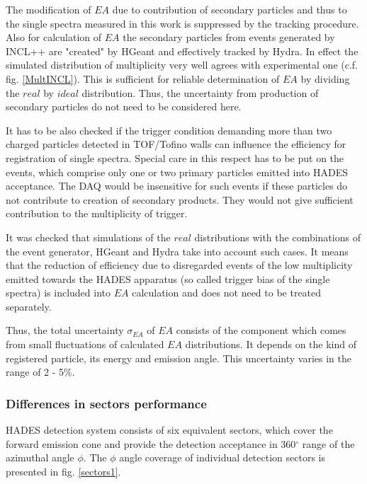 The modification of $EA$ due to contribution of secondary particles and thus to the single spectra measured in this work is suppressed by the
tracking procedure. Also for calculation of $EA$ the 
secondary particles from events generated by INCL++ 
are "created" by HGeant and effectively tracked by Hydra. In effect the simulated distribution of multiplicity very well agrees with experimental one (c.f. fig. \ref{MultINCL}). This is sufficient for 
reliable determination of $EA$ by dividing the $real$ by $ideal$ distribution. Thus, the uncertainty 
from production of secondary particles  do not need to be considered here.

It has to be also checked if the trigger condition
demanding more than two charged particles detected 
in TOF/Tofino walls can influence the efficiency for registration of single spectra. 
Special care in this respect has to be put on the events, which comprise only one or two 
primary particles emitted into HADES acceptance.
The DAQ would be insensitive for such events if  
these particles do not contribute to creation of 
secondary products. They would not give sufficient contribution to the multiplicity of trigger.

It was checked that simulations of the $real$ distributions with the combinations of the event generator, HGeant and Hydra take into account 
such cases. It means that the reduction 
of efficiency due to disregarded events of 
the low multiplicity emitted towards 
the HADES apparatus (so called trigger bias of the 
single spectra) is included into $EA$ calculation 
and does not need to be treated separately.  

Thus, the total uncertainty $\sigma_{EA}$ of $EA$ consists of the component which comes from small fluctuations of calculated $EA$ distributions. It depends on the kind of registered particle, its energy and emission angle. This uncertainty varies in the range of 2 - 5\%.

\subsubsection{Differences in sectors performance}
\label{sect}


HADES detection system consists of six equivalent sectors, which cover the forward 
emission cone and provide the detection acceptance in 360$^{\circ}$ range of the azimuthal angle $\phi$.
The $\phi$ angle coverage of individual 
detection sectors is presented in fig. \ref{sectors1}.

